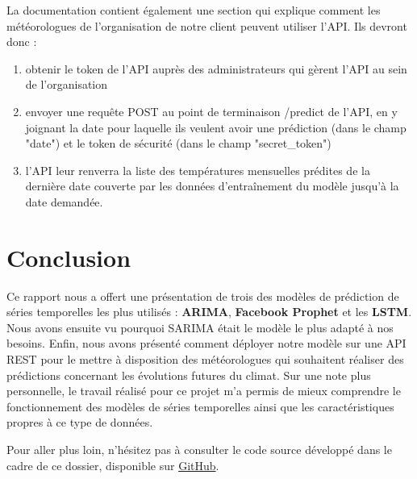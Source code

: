 \documentclass[french]{article}
\begin{document}
    La documentation contient également une section qui explique comment les météorologues de l'organisation de notre client peuvent utiliser l'API. Ils devront donc :
    \begin{enumerate}
        \item obtenir le token de l'API auprès des administrateurs qui gèrent l'API au sein de l'organisation
        \item envoyer une requête POST au point de terminaison /predict de l'API, en y joignant la date pour laquelle ils veulent avoir une prédiction (dans le champ "date") et le token de sécurité (dans le champ "secret\_token")
        \item l'API leur renverra la liste des températures mensuelles prédites de la dernière date couverte par les données d'entraînement du modèle jusqu'à la date demandée.
    \end{enumerate}

    \section*{Conclusion}
    Ce rapport nous a offert une présentation de trois des modèles de prédiction de séries temporelles les plus utilisés : \textbf{ARIMA}, \textbf{Facebook Prophet} et les \textbf{LSTM}. Nous avons ensuite vu pourquoi SARIMA était le modèle le plus adapté à nos besoins. Enfin, nous avons présenté comment déployer notre modèle sur une API REST pour le mettre à disposition des météorologues qui souhaitent réaliser des prédictions concernant les évolutions futures du climat.
    Sur une note plus personnelle, le travail réalisé pour ce projet m'a permis de mieux comprendre le fonctionnement des modèles de séries temporelles ainsi que les caractéristiques propres à ce type de données.

    Pour aller plus loin, n'hésitez pas à consulter le code source développé dans le cadre de ce dossier, disponible sur \href{https://github.com/vinpap/predict_climate_change}{GitHub}.

\end{document}
